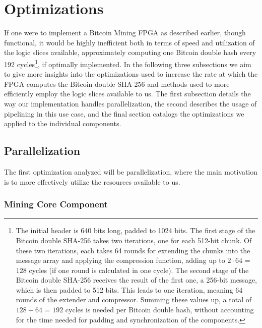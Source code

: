 \section{Optimizations}
\label{optimization}

If one were to implement a Bitcoin Mining FPGA as described earlier, though functional, it would be highly inefficient both in terms of speed and utilization of the logic slices available, approximately computing one Bitcoin double hash every 192 cycles\footnote{The initial header is 640 bits long, padded to 1024 bits. The first stage of the Bitcoin double SHA-256 takes two iterations, one for each 512-bit chunk. Of these two iterations, each takes 64 rounds for extending the chunks into the message array and applying the compression function, adding up to $2 \cdot 64$ = $128$ cycles (if one round is calculated in one cycle). The second stage of the Bitcoin double SHA-256 receives the result of the first one, a 256-bit message, which is then padded to 512 bits. This leads to one iteration, meaning $64$ rounds of the extender and compressor. Summing these values up, a total of $128+64$ = $192$ cycles is needed per Bitcoin double hash, without accounting for the time needed for padding and synchronization of the components.}, if optimally implemented. In the following three subsections we aim to give more insights into the optimizations used to increase the rate at which the FPGA computes the Bitcoin double SHA-256 and methods used to more efficiently employ the logic slices available to us. The first subsection details the way our implementation handles parallelization, the second describes the usage of pipelining in this use case, and the final section catalogs the optimizations we applied to the individual components.


\subsection{Parallelization}

The first optimization analyzed will be parallelization, where the main motivation is to more effectively utilize the resources available to us.

\subsubsection{Mining Core Component}
\label{mc_component}

